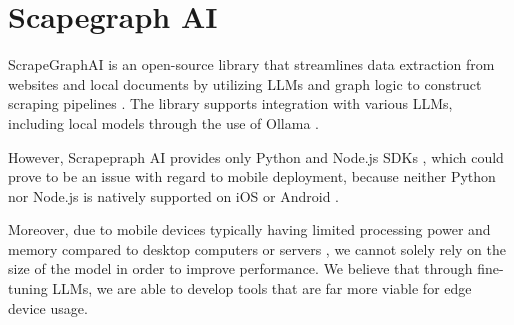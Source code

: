 \documentclass[licencjacka,en]{pracamgr}
\begin{document}
\section{Scapegraph AI}
ScrapeGraphAI is an open-source library that streamlines data extraction from websites and local documents by utilizing LLMs and graph logic to construct scraping pipelines \cite{scapegraph_repo}. The library supports integration with various LLMs, including local models through the use of Ollama \cite{ollama_repo} \cite{scapegraph_usage}.

However, Scrapepraph AI provides only Python and Node.js SDKs \cite{scapegraph_sdks}, which could prove to be an issue with regard to mobile deployment, because neither Python nor Node.js is natively supported on iOS or Android \cite{android_dev_site} \cite{ios_dev_site}.

Moreover, due to mobile devices typically having limited processing power and memory compared to desktop computers or servers \cite{mobile_resources}, we cannot solely rely on the size of the model in order to improve performance. We believe that through fine-tuning LLMs, we are able to develop tools that are far more viable for edge device usage.


\end{document}
